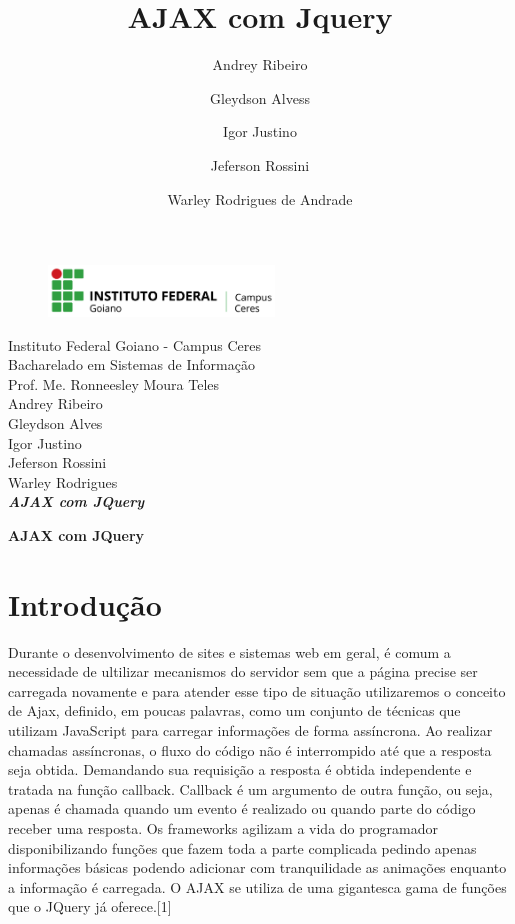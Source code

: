 \documentclass[12pt,a4paper]{article}
\title{AJAX com Jquery}
\author{Andrey Ribeiro \and Gleydson Alvess\and Igor Justino\and Jeferson Rossini\and Warley Rodrigues de Andrade}
\begin{document}
\begin{titlepage}
\begin{center}
\begin{figure}[htb]
                
                \label{figura:LogoIF}
        
                \centering
                \includegraphics[width=6cm]{recursos/imagens/logo.png} 
\end{figure}
Instituto Federal Goiano - Campus Ceres\\
Bacharelado em Sistemas de Informação\\
Prof. Me. Ronneesley Moura Teles\\\vspace{0.5cm}
Andrey Ribeiro \\
Gleydson Alves\\
Igor Justino\\
Jeferson Rossini\\
Warley Rodrigues\\
\vspace{5.0cm}
\textit{\textbf{\Large{AJAX com JQuery}}}\\\vspace{0.5cm}
\vspace{9.5cm}
\end{center}
\end{titlepage}
\tableofcontents
\newpage
\begin{center}
\textbf{\Large{AJAX com JQuery}}\\\vspace{0.5cm}
\end{center}
\section{Introdução}
Durante o desenvolvimento de sites e sistemas web em geral, é comum a necessidade de ultilizar mecanismos do servidor sem que a página precise ser carregada novamente e para atender esse tipo de situação utilizaremos o conceito de Ajax, definido, em poucas palavras, como um conjunto de técnicas que utilizam JavaScript para carregar informações de forma assíncrona.
Ao realizar chamadas assíncronas, o fluxo do código não é interrompido até que a resposta seja obtida. Demandando sua requisição a resposta é obtida independente e tratada na função callback. Callback é um argumento de outra função, ou seja, apenas é chamada quando um evento é realizado ou quando parte do código receber uma resposta.
Os frameworks agilizam a vida do programador disponibilizando funções que fazem toda a parte complicada pedindo apenas informações básicas podendo adicionar com tranquilidade as animações enquanto a informação é carregada. O AJAX se utiliza de uma gigantesca gama de funções que o JQuery já oferece.[1]
\end{document}
